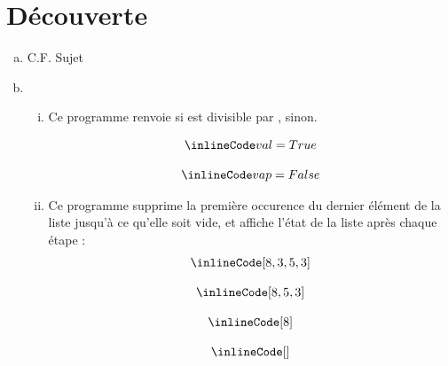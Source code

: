 \section{Découverte}
\begin{enumerate}[(a)]
  \item C.F. Sujet
  \item {}
        \begin{enumerate}[i.]
          \item {}

                \qquad Ce programme renvoie  si  est divisible par ,  sinon.

                \[
                  \begin{array}{c}
                    \il{val = True}  \\\\
                    \il{vap = False} \\
                  \end{array}
                \]
          \item {}

                \qquad Ce programme supprime la première occurence du dernier élément de la liste  jusqu'à ce qu'elle soit vide, et affiche
                l'état de la liste après chaque étape :
                \[
                  \begin{array}{c}
                    \il{[8, 3, 5, 3]} \\\\
                    \il{[8, 5, 3]}    \\\\
                    \il{[8]}          \\\\
                    \il{ []}          \\\\
                  \end{array}
                \]
        \end{enumerate}
\end{enumerate}
